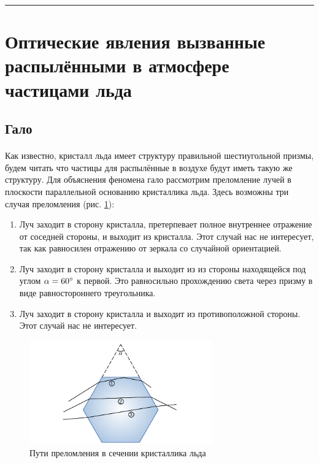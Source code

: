 \documentclass[a4paper,12pt]{article} %
\begin{document}
\medskip\hrule\medskip

\section{Оптические явления вызванные распылёнными в атмосфере частицами льда}

\subsection{Гало}

\paragraph{} Как известно, кристалл льда имеет структуру правильной шестиугольной призмы, будем читать что частицы для распылённые в воздухе будут иметь такую же структуру. Для объяснения феномена гало рассмотрим преломление лучей в плоскости параллельной основанию кристаллика льда. Здесь возможны три случая преломления (рис. \ref{fig:iceprism}): 

\begin{enumerate}
\item Луч заходит в сторону кристалла, претерпевает полное внутреннее отражение от соседней стороны, и выходит из кристалла. Этот случай нас не интересует, так как равносилен отражению от зеркала со случайной ориентацией.
\item Луч заходит в сторону кристалла и выходит из из стороны находящейся под углом $\alpha = 60\degree$ к первой. Это равносильно прохождению света через призму в виде равностороннего треугольника. 
\item Луч заходит в сторону кристалла и выходит из противоположной стороны. Этот случай нас не интересует.
\end{enumerate}

\begin{figure}
\centering
\includegraphics[width=0.7\textwidth]{iceprism.pdf}
\caption{Пути преломления в сечении кристаллика льда}
\label{fig:iceprism}
\end{figure}
\end{document}
